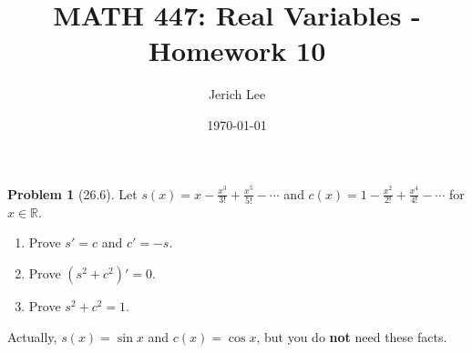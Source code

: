 \documentclass[12pt]{article}
\title{MATH 447: Real Variables - Homework 10}
\author{Jerich Lee}
\date{\today}
\theoremstyle{definition} %
\newtheorem{problem}{Problem}
\theoremstyle{plain} %
\begin{document}
\maketitle
\begin{problem}[26.6]
    \noindent 
    Let $ s(x) = x - \frac{x^3}{3!} + \frac{x^5}{5!} - \cdots $ and $ c(x) = 1 - \frac{x^2}{2!} + \frac{x^4}{4!} - \cdots $ for $ x \in \mathbb{R} $.
    \begin{enumerate}
        \item Prove $ s' = c $ and $ c' = -s $.
        \item Prove $ (s^2 + c^2)' = 0 $.
        \item Prove $ s^2 + c^2 = 1 $.
    \end{enumerate}
    
    Actually, $ s(x) = \sin x $ and $ c(x) = \cos x $, but you do \textbf{not} need these facts.
\end{problem}
\end{document}
